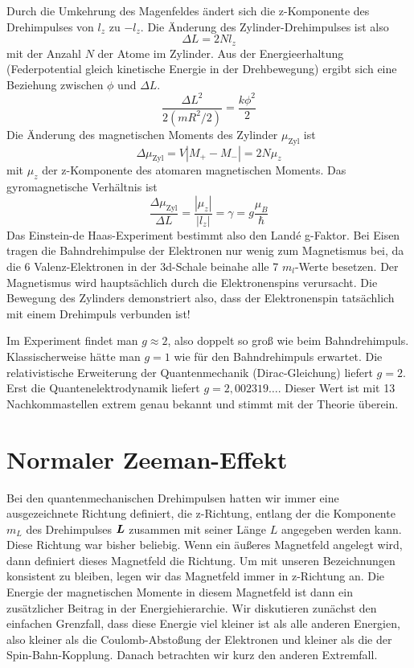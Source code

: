 Durch die Umkehrung des Magenfeldes ändert sich die z-Komponente des Drehimpulses von $l_z$ zu $-l_z$. Die Änderung des Zylinder-Drehimpulses ist also 
\begin{equation}
    \Delta L = 2 N l_z
\end{equation}
mit der Anzahl $N$ der Atome im Zylinder. Aus der Energieerhaltung (Federpotential gleich kinetische Energie in der Drehbewegung) ergibt sich eine Beziehung zwischen $\phi$ und $\Delta L$.
\begin{equation}
\frac{\Delta L ^2}{2 (mR^2/2)} = \frac{k \phi^2}{2}    
\end{equation}
Die Änderung des magnetischen  Moments des Zylinder $\mu_\text{Zyl}$ ist
\begin{equation}
   \Delta  \mu_\text{Zyl} = V | M_+ - M_-| = 2 N \mu_z
\end{equation}
mit $\mu_z$ der z-Komponente des atomaren magnetischen Moments. Das gyromagnetische Verhältnis ist
\begin{equation}
    \frac{ \Delta  \mu_\text{Zyl}}{\Delta L}
    = \frac{|\mu_z|}{|l_z|} = \gamma = g \frac{\mu_B}{\hbar}
\end{equation}
Das Einstein-de Haas-Experiment bestimmt also den Landé g-Faktor. Bei Eisen tragen die Bahndrehimpulse der Elektronen nur wenig zum Magnetismus bei, da die 6 Valenz-Elektronen in der  3d-Schale beinahe alle 7 $m_l$-Werte besetzen. 
Der Magnetismus wird hauptsächlich durch die Elektronenspins verursacht. Die Bewegung des Zylinders demonstriert also, dass der Elektronenspin tatsächlich mit einem Drehimpuls verbunden ist! 

Im Experiment findet man $g \approx 2$, also doppelt so groß wie beim Bahndrehimpuls. Klassischerweise hätte man $g=1$ wie für den Bahndrehimpuls erwartet. Die relativistische Erweiterung der Quantenmechanik (Dirac-Gleichung) liefert $g=2$. Erst die Quantenelektrodynamik liefert $g=2,002319\dots$. Dieser Wert ist mit 13 Nachkommastellen extrem genau bekannt und stimmt mit der Theorie überein.


\section{Normaler Zeeman-Effekt}

Bei den quantenmechanischen Drehimpulsen hatten wir immer eine ausgezeichnete Richtung definiert, die z-Richtung, entlang der die Komponente $m_L$ des Drehimpulses $\boldsymbol{L}$ zusammen mit seiner Länge $L$ angegeben werden kann. Diese Richtung war bisher beliebig. Wenn ein äußeres Magnetfeld angelegt wird, dann definiert dieses Magnetfeld die Richtung. Um mit unseren Bezeichnungen konsistent zu bleiben, legen wir das Magnetfeld immer in z-Richtung an. Die Energie der magnetischen Momente in diesem Magnetfeld ist dann ein zusätzlicher Beitrag in der Energiehierarchie. Wir diskutieren zunächst den einfachen Grenzfall, dass diese Energie viel kleiner ist als alle anderen Energien, also kleiner als die Coulomb-Abstoßung  der Elektronen und kleiner als die der Spin-Bahn-Kopplung. Danach betrachten wir kurz den anderen Extremfall.

